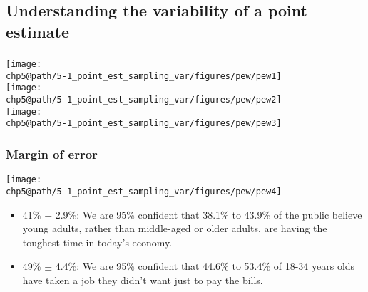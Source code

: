 
\subsection{Understanding the variability of a point estimate}


\begin{frame}
\frametitle{}

\begin{center}
\texttt{[image: \\chp5@path/5-1\_point\_est\_sampling\_var/figures/pew/pew1]} \\
\texttt{[image: \\chp5@path/5-1\_point\_est\_sampling\_var/figures/pew/pew2]} \\
\texttt{[image: \\chp5@path/5-1\_point\_est\_sampling\_var/figures/pew/pew3]}
\end{center}


\end{frame}


\begin{frame}
\frametitle{Margin of error}

\begin{center}
\texttt{[image: \\chp5@path/5-1\_point\_est\_sampling\_var/figures/pew/pew4]}
\end{center}

\begin{itemize}

\item 41\% $\pm$ 2.9\%: We are 95\% confident that 38.1\% to 43.9\% of the public believe young adults, rather than middle-aged or older adults, are having the toughest time in today's economy.

\item 49\% $\pm$ 4.4\%: We are 95\% confident that 44.6\% to 53.4\% of 18-34 years olds have taken a job they didn't want just to pay the bills.

\end{itemize}

\end{frame}


